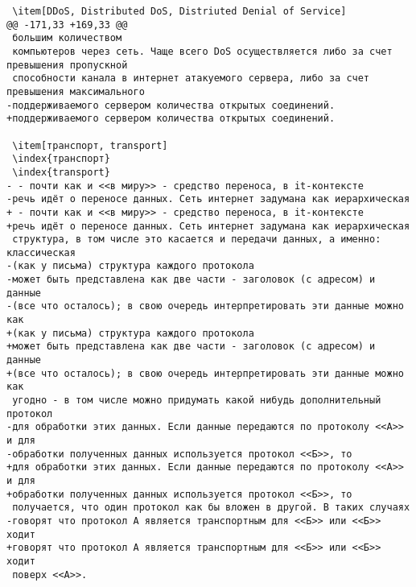 \begin{verbatim}
 \item[DDoS, Distributed DoS, Distriuted Denial of Service]
@@ -171,33 +169,33 @@
 большим количеством
 компьютеров через сеть. Чаще всего DoS осуществляется либо за счет превышения пропускной
 способности канала в интернет атакуемого сервера, либо за счет превышения максимального
-поддерживаемого сервером количества открытых соединений.
+поддерживаемого сервером количества открытых соединений.

 \item[транспорт, transport]
 \index{транспорт}
 \index{transport}
- - почти как и <<в миру>> - средство переноса, в it-контексте
-речь идёт о переносе данных. Сеть интернет задумана как иерархическая
+ - почти как и <<в миру>> - средство переноса, в it-контексте
+речь идёт о переносе данных. Сеть интернет задумана как иерархическая
 структура, в том числе это касается и передачи данных, а именно: классическая
-(как у письма) структура каждого протокола
-может быть представлена как две части - заголовок (с адресом) и данные
-(все что осталось); в свою очередь интерпретировать эти данные можно как
+(как у письма) структура каждого протокола
+может быть представлена как две части - заголовок (с адресом) и данные
+(все что осталось); в свою очередь интерпретировать эти данные можно как
 угодно - в том числе можно придумать какой нибудь дополнительный протокол
-для обработки этих данных. Если данные передаются по протоколу <<А>> и для
-обработки полученных данных используется протокол <<Б>>, то
+для обработки этих данных. Если данные передаются по протоколу <<А>> и для
+обработки полученных данных используется протокол <<Б>>, то
 получается, что один протокол как бы вложен в другой. В таких случаях
-говорят что протокол A является транспортным для <<Б>> или <<Б>> ходит
+говорят что протокол A является транспортным для <<Б>> или <<Б>> ходит
 поверх <<А>>.


\end{verbatim}

